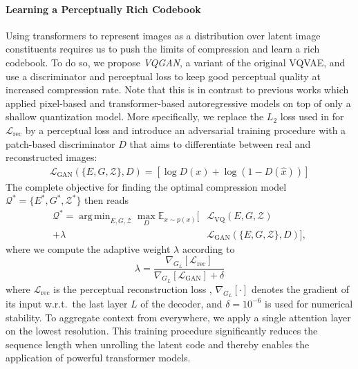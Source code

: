 \documentclass[final]{cvpr}
\newcommand{\codebook}{\mathcal{Z}}
\newcommand{\discriminator}{D}
\newcommand{\decoder}{G}
\newcommand{\encoder}{E}
\DeclareMathOperator*{\argmin}{arg\,min}
\begin{document}
\paragraph{Learning a Perceptually Rich Codebook}
Using transformers to represent images as a distribution over latent image constituents requires us to push the limits of compression and learn a rich codebook. 
To do so, we propose \emph{VQGAN}, a variant of the original VQVAE,
and use a discriminator and perceptual loss
\cite{larsen2015autoencoding,johnson2016perceptual,lamb2016discriminative,dosovitskiy2016generating,mentzer2020highfidelity} to keep good perceptual quality at
increased compression rate. Note that this is in contrast to previous works which applied pixel-based
\cite{oord2016conditional,razavi2019generating} and transformer-based
autoregressive models \cite{chen2020generative} on top of only a shallow quantization model.
More specifically, we replace the $L_2$ loss
used in \cite{oord2018neural}
for $\mathcal{L}_{\text{rec}}$
by a perceptual loss and introduce an adversarial
training procedure with a patch-based discriminator $\discriminator$
\cite{isola2017image} that aims to differentiate between real and reconstructed images:
\begin{align}
%
\mathcal{L}_{\text{GAN}}(\{\encoder, \decoder, \codebook \}, \discriminator) =
  \left[ \log \discriminator(x) + \log (1 - \discriminator(\hat{x}))\right]
\label{eq:ourvqloss}
\end{align}
The complete objective for finding the optimal compression model $\mathcal{Q}^* = \{\encoder^*, \decoder^*, \codebook^* \}$ then reads
\begin{align}
%
\mathcal{Q}^* = \argmin_{\encoder, \decoder, \codebook} \max_{\discriminator}
  \mathbb{E}_{x\sim p(x)} \Big[
    &\mathcal{L}_{\text{VQ}}(\encoder, \decoder, \codebook) \nonumber \\
    + \lambda &\mathcal{L}_{\text{GAN}}(\{\encoder, \decoder, \codebook \}, \discriminator)
    \Big],
\end{align}
where we compute the adaptive weight $\lambda$ according to
\begin{equation}
\lambda = \frac{\nabla_{\decoder_L}[ \mathcal{L}_{\text{rec}} ]}{\nabla_{\decoder_L} [\mathcal{L}_{\text{GAN}}] + \delta}
\end{equation}
where $\mathcal{L}_{\text{rec}}$ is the perceptual reconstruction loss
\cite{zhang2018perceptual}, $\nabla_{\decoder_L}[\cdot]$ denotes the gradient of its input
w.r.t.\ the last layer $L$ of the decoder, and $\delta = 10^{-6}$ is used for numerical stability. To aggregate context from everywhere, we apply a single attention layer on the lowest resolution. This training procedure significantly reduces the sequence length when unrolling the latent code and thereby enables the application of powerful transformer models.
\end{document}
